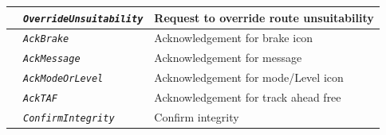 \begin{itemize}
\begin{longtable}{|l|l|l|}
			\hline

			&	\begin{minipage}[t]{0.30\linewidth} \emph{\texttt{OverrideUnsuitability}} \end{minipage}
			&	\begin{minipage}[t]{0.38\linewidth} Request to override route unsuitability \end{minipage} \\

			\hline

			&	\begin{minipage}[t]{0.30\linewidth} \emph{\texttt{AckBrake}} \end{minipage}
			&	\begin{minipage}[t]{0.38\linewidth} Acknowledgement for brake icon \end{minipage} \\

			\hline

			&	\begin{minipage}[t]{0.35\linewidth} \emph{\texttt{AckMessage}} \end{minipage}
			&	\begin{minipage}[t]{0.38\linewidth} Acknowledgement for message \end{minipage} \\

			\hline

			&	\begin{minipage}[t]{0.30\linewidth} \emph{\texttt{AckModeOrLevel}} \end{minipage}
			&	\begin{minipage}[t]{0.38\linewidth} Acknowledgement for mode/Level icon \end{minipage} \\

			\hline

			&	\begin{minipage}[t]{0.30\linewidth} \emph{\texttt{AckTAF}} \end{minipage}
			&	\begin{minipage}[t]{0.38\linewidth} Acknowledgement for track ahead free \end{minipage} \\

			\hline

			&	\begin{minipage}[t]{0.30\linewidth} \emph{\texttt{ConfirmIntegrity}} \end{minipage}
			&	\begin{minipage}[t]{0.38\linewidth} Confirm integrity \end{minipage} \\


\end{longtable}
\end{itemize}
